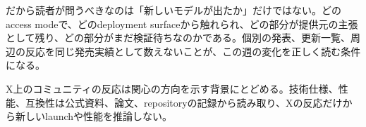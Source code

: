 だから読者が問うべきなのは「新しいモデルが出たか」だけではない。どのaccess modeで、どのdeployment surfaceから触れられ、どの部分が提供元の主張として残り、どの部分がまだ検証待ちなのかである。個別の発表、更新一覧、周辺の反応を同じ発売実績として数えないことが、この週の変化を正しく読む条件になる。

\begin{technicalnote}[公開情報の境界]
X上のコミュニティの反応は関心の方向を示す背景にとどめる。技術仕様、性能、互換性は公式資料、論文、repositoryの記録から読み取り、Xの反応だけから新しいlaunchや性能を推論しない\cite{w33-community}。
\end{technicalnote}

